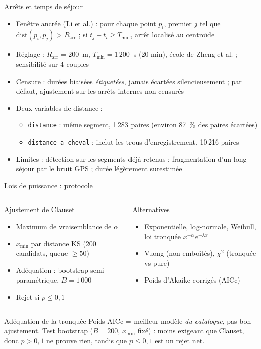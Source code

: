 \documentclass[aspectratio=169,11pt]{beamer}
\newcommand{\code}[1]{\texttt{#1}}
\begin{document}
\begin{frame}{Arrêts et temps de séjour}
\begin{itemize}
  \item \alert{Fenêtre ancrée} (Li et al.) : pour chaque point $p_i$, premier $j$ tel que $\mathrm{dist}(p_i,p_j)>R_{\mathrm{arr}}$ ; si $t_j-t_i\ge T_{\min}$, arrêt localisé au centroïde
  \item Réglage : $R_{\mathrm{arr}}=200$~m, $T_{\min}=1\,200$~s (20 min), école de Zheng et al. ; sensibilité sur 4 couples
  \item \alert{Censure} : durées biaisées \emph{étiquetées}, jamais écartées silencieusement ; par défaut, ajustement sur les arrêts internes non censurés
  \item Deux variables de distance :
  \begin{itemize}
    \item \code{distance} : même segment, 1\,283 paires (environ 87~\% des paires écartées)
    \item \code{distance\_a\_cheval} : inclut les trous d'enregistrement, 10\,216 paires
  \end{itemize}
  \item Limites : détection sur les segments déjà retenus ; fragmentation d'un long séjour par le bruit GPS ; durée légèrement surestimée
\end{itemize}
\end{frame}

\begin{frame}{Lois de puissance : protocole}
\begin{columns}[T]
\begin{block}{Ajustement de Clauset}
\small
\begin{itemize}
  \item Maximum de vraisemblance de $\alpha$
  \item $x_{\min}$ par distance KS (200 candidats, queue $\ge50$)
  \item Adéquation : bootstrap semi-paramétrique, $B=1\,000$
  \item Rejet si $p\le0{,}1$
\end{itemize}
\end{block}
\begin{block}{Alternatives}
\small
\begin{itemize}
  \item Exponentielle, log-normale, Weibull, loi \alert{tronquée} $x^{-\alpha}e^{-\lambda x}$
  \item Vuong (non emboîtés), $\chi^2$ (tronquée vs pure)
  \item Poids d'Akaike corrigés (AICc)
\end{itemize}
\end{block}
\end{columns}
\begin{alertblock}{Adéquation de la tronquée}
Poids AICc = meilleur modèle \emph{du catalogue}, pas bon ajustement. Test bootstrap ($B=200$, $x_{\min}$ fixé) : moins exigeant que Clauset, donc $p>0{,}1$ ne prouve rien, tandis que $p\le0{,}1$ est un rejet net.
\end{alertblock}
\end{frame}
\end{document}
